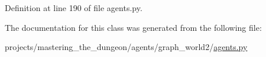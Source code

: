 Definition at line 190 of file agents.\+py.



The documentation for this class was generated from the following file\+:\begin{DoxyCompactItemize}
\item 
projects/mastering\+\_\+the\+\_\+dungeon/agents/graph\+\_\+world2/\hyperlink{projects_2mastering__the__dungeon_2agents_2graph__world2_2agents_8py}{agents.\+py}\end{DoxyCompactItemize}
